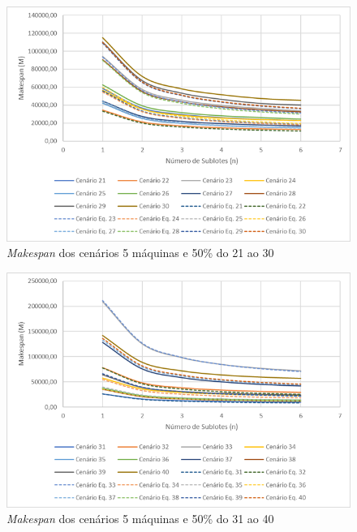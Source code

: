 \begin{figure}[H]
    \centering
    \includegraphics[width=13cm]{Apendices/Figuras/05m50_21-30}
    \caption{\textit{Makespan} dos cenários 5 máquinas e 50\% do 21 ao 30}
    \label{fig:05m50_21-30}
\end{figure}

\begin{figure}[H]
    \centering
    \includegraphics[width=13cm]{Apendices/Figuras/05m50_31-40}
    \caption{\textit{Makespan} dos cenários 5 máquinas e 50\% do 31 ao 40}
    \label{fig:05m50_31-40}
\end{figure}

